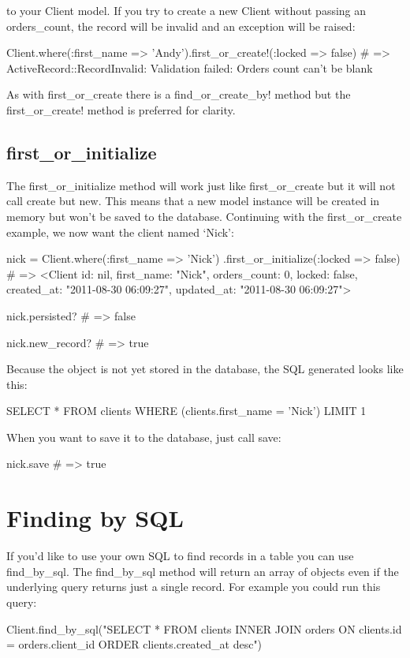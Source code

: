 \documentclass[10pt]{book}
\newenvironment{code}{%
  \scriptsize
    \verbatim
}{%
    \endverbatim
    \newline
}
\begin{document}
to your Client model. If you try to create a new Client without passing an orders\_count, the record will be invalid and an exception will be raised:
\begin{code}
Client.where(:first_name => 'Andy').first_or_create!(:locked => false)
# => ActiveRecord::RecordInvalid: Validation failed: 
Orders count can't be blank
\end{code}

As with first\_or\_create there is a find\_or\_create\_by! method but the first\_or\_create! method is preferred for clarity.

\subsection{ first\_or\_initialize}

The first\_or\_initialize method will work just like first\_or\_create but it will not call create but new. This means that a new model instance will be created in memory but won’t be saved to the database. Continuing with the first\_or\_create example, we now want the client named ‘Nick’:
\begin{code}
nick = Client.where(:first_name => 'Nick')
      .first_or_initialize(:locked => false)
#
 => <Client id: nil, first_name: "Nick", orders_count: 0, locked: 
false, created_at: "2011-08-30 06:09:27", updated_at: "2011-08-30 
06:09:27">
 
nick.persisted?
# => false
 
nick.new_record?
# => true
\end{code}

Because the object is not yet stored in the database, the SQL generated looks like this:
\begin{code}
SELECT * FROM clients WHERE (clients.first_name = 'Nick') LIMIT 1
\end{code}

When you want to save it to the database, just call save:
\begin{code}
nick.save
# => true
\end{code}

\section{ Finding by SQL}

If you’d like to use your own SQL to find records in a table you can use find\_by\_sql. The find\_by\_sql  method will return an array of objects even if the underlying query  returns just a single record. For example you could run this query:
\begin{code}
Client.find_by_sql("SELECT * FROM clients
  INNER JOIN orders ON clients.id = orders.client_id
  ORDER clients.created_at desc")
\end{code}
\end{document}
